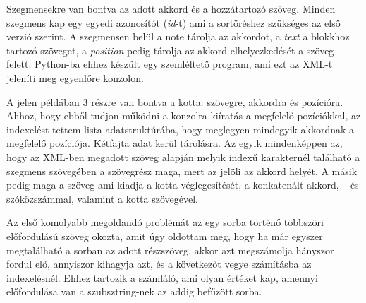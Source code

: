 Szegmensekre van bontva az adott akkord és a hozzátartozó szöveg. Minden szegmens kap egy egyedi azonosítót (\textit{id}-t) ami a sortöréshez szükséges az első verzió szerint. A szegmensen belül a note tárolja az akkordot, a \textit{text} a blokkhoz tartozó szöveget, a \textit{position} pedig tárolja az akkord elhelyezkedését a szöveg felett. Python-ba ehhez készült egy szemléltető program, ami ezt az XML-t jeleníti meg egyenlőre konzolon.


A jelen példában 3 részre van bontva a kotta: szövegre, akkordra és pozícióra. Ahhoz, hogy ebből tudjon  működni a konzolra kiíratás a megfelelő pozíciókkal, az indexelést tettem lista adatstruktúrába, hogy meglegyen mindegyik akkordnak a megfelelő pozíciója. Kétfajta adat kerül tárolásra. Az egyik mindenképpen az, hogy az XML-ben megadott szöveg alapján melyik indexű karakternél található a szegmens szövegében a szövegrész maga, mert az jelöli az akkord helyét. A másik pedig maga a szöveg ami kiadja a kotta véglegesítését, a konkatenált akkord, -- és szóközszámmal, valamint a kotta szövegével.

Az első komolyabb megoldandó problémát az egy sorba történő többszöri előfordulású szöveg okozta, amit úgy oldottam meg, hogy ha már egyszer megtalálható a sorban az adott részszöveg, akkor azt megszámolja hányszor fordul elő, annyiszor kihagyja azt, és a következőt vegye számításba az indexelésnél. Ehhez tartozik a számláló, ami olyan értéket kap, amennyi előfordulása van a szubsztring-nek az addig befűzött sorba.


